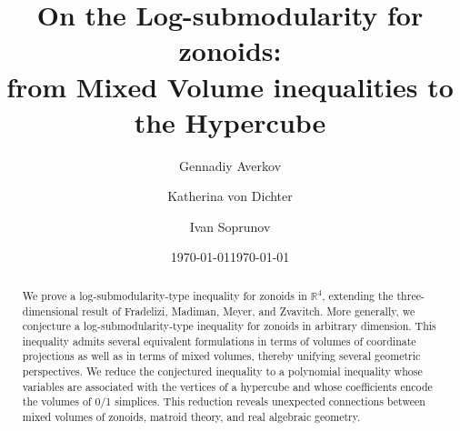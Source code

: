 \documentclass[11pt]{amsart}
\date{\today}
\theoremstyle{definition}
\theoremstyle{remark}
\begin{document}


\title[Mixed Volume Inequalities for Zonoids]{On the Log-submodularity for zonoids: \\ from Mixed Volume inequalities to the Hypercube}



\author[G. Averkov]{Gennadiy Averkov}
\address{Fakult\"at 1, BTU Cottbus-Senftenberg, Platz der Deutschen Einheit 1, 03046 Cottbus, Germany}

\author[K. von Dichter]{Katherina von Dichter}

\author[I. Soprunov]{Ivan Soprunov}
\address{Department of Mathematics and Statistics, Cleveland State University,  2121 Euclid Ave, Cleveland, Ohio, 44115 USA}

\date{\today}\maketitle

\begin{abstract}
We prove a log-submodularity-type inequality for zonoids in $\mathbb{R}^4$, extending the three-dimensional result of Fradelizi, Madiman, Meyer, and Zvavitch. More generally, we conjecture a log-submodularity-type inequality for zonoids in arbitrary dimension. This inequality  admits several equivalent formulations in terms of volumes of coordinate projections as well as in terms of mixed volumes, 
thereby unifying several geometric perspectives. We reduce the conjectured inequality to a polynomial inequality whose variables are associated with the vertices of a hypercube and whose coefficients encode the volumes of 0/1 simplices. This reduction reveals unexpected connections between mixed volumes of zonoids, matroid theory, and real algebraic geometry.

\end{abstract}
\end{document}
